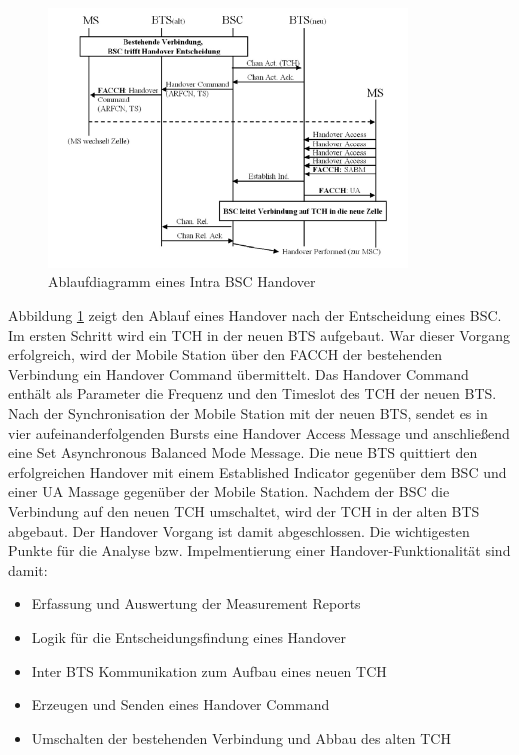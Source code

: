 \begin{figure}[h!]
  \centering
  \includegraphics[width=0.85\textwidth]{img/handover.png}
  \caption{Ablaufdiagramm eines Intra BSC Handover \cite{bib:grundkursmks}}
  \label{fig:adhandover}
\end{figure}

Abbildung \ref{fig:adhandover} zeigt den Ablauf eines Handover nach der Entscheidung eines BSC. Im ersten Schritt wird ein TCH in der neuen BTS aufgebaut. War dieser Vorgang erfolgreich, wird der Mobile Station über den FACCH der bestehenden Verbindung ein Handover Command übermittelt. Das Handover Command enthält als Parameter die Frequenz und den Timeslot des TCH der neuen BTS. Nach der Synchronisation der Mobile Station mit der neuen BTS, sendet es in vier aufeinanderfolgenden Bursts eine Handover Access Message und anschließend eine Set Asynchronous Balanced Mode Message. Die neue BTS quittiert den erfolgreichen Handover mit einem Established Indicator gegenüber dem BSC und einer UA Massage gegenüber der Mobile Station. Nachdem der BSC die Verbindung auf den neuen TCH umschaltet, wird der TCH in der alten BTS abgebaut. Der Handover Vorgang ist damit abgeschlossen. Die wichtigesten Punkte für die Analyse bzw. Impelmentierung einer Handover-Funktionalität sind damit:

\begin{itemize}
 \item Erfassung und Auswertung der Measurement Reports
 \item Logik für die Entscheidungsfindung eines Handover
 \item Inter BTS Kommunikation zum Aufbau eines neuen TCH
 \item Erzeugen und Senden eines Handover Command
 \item Umschalten der bestehenden Verbindung und Abbau des alten TCH
\end{itemize}

